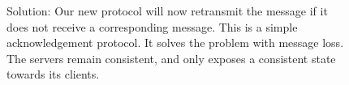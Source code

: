 
\begin{figure}
\centering
\thefontsize
{}
\caption{\label{a2}Solution: Our new protocol will now retransmit the  message if it does not receive a corresponding  message. This is a simple acknowledgement protocol. It solves the problem with message loss. The servers remain consistent, and only exposes a consistent state towards its clients.}
\end{figure}
